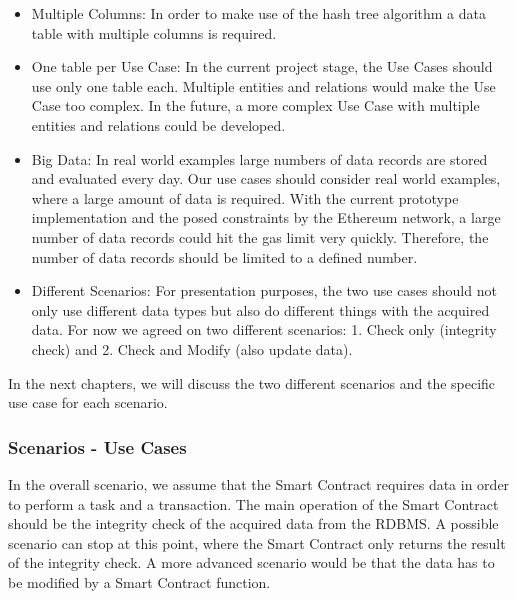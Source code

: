 \begin{itemize}
\item Multiple Columns:
In order to make use of the hash tree algorithm a data table with multiple columns is required.
\item One table per Use Case:
In the current project stage, the Use Cases should use only one table each. Multiple entities and relations would make the Use Case too complex. In the future, a more complex Use Case with multiple entities and relations could be developed.
\item Big Data:
In real world examples large numbers of data records are stored and evaluated every day. Our use cases should consider real world examples, where a large amount of data is required. With the current prototype implementation and the posed constraints by the Ethereum network, a large number of data records could hit the gas limit very quickly. Therefore, the number of data records should be limited to a defined number.
\item Different Scenarios:
For presentation purposes, the two use cases should not only use different data types but also do different things with the acquired data. For now we agreed on two different scenarios: 1. Check only (integrity check) and 2. Check and Modify (also update data).
\end{itemize}

In the next chapters, we will discuss the two different scenarios and the specific use case for each scenario.

\subsubsection{Scenarios - Use Cases}
In the overall scenario, we assume that the Smart Contract requires data in order to perform a task and a transaction. The main operation of the Smart Contract should be the integrity check of the acquired data from the RDBMS. A possible scenario can stop at this point, where the Smart Contract only returns the result of the integrity check. A more advanced scenario would be that the data has to be modified by a Smart Contract function.



